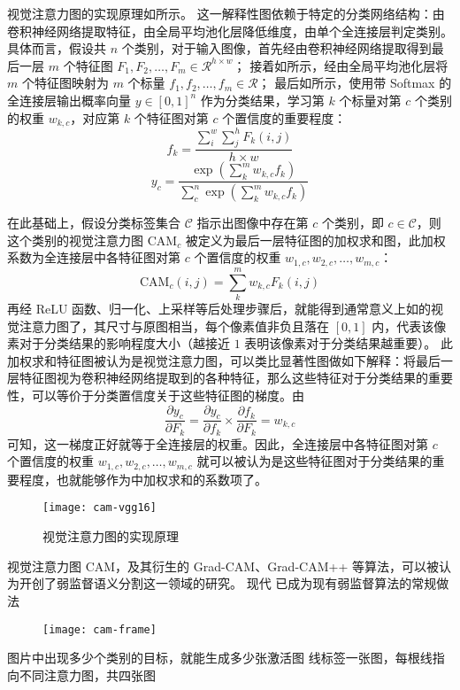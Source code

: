 \par
视觉注意力图的实现原理如所示。
这一解释性图依赖于特定的分类网络结构：由卷积神经网络提取特征，由全局平均池化层\cite{lin2013network}降低维度，由单个全连接层判定类别。
具体而言，假设共 $n$ 个类别，对于输入图像，首先经由卷积神经网络提取得到最后一层 $m$ 个特征图 $F_1, F_2, \dots, F_m \in \mathcal{R}^{h \times w}$；
接着如所示，经由全局平均池化层将 $m$ 个特征图映射为 $m$ 个标量 $f_1, f_2, \dots, f_m \in \mathcal{R}$；
最后如所示，使用带 Softmax 的全连接层输出概率向量 $y \in [0,1]^{n}$ 作为分类结果，学习第 $k$ 个标量对第 $c$ 个类别的权重 $w_{k,c}$，对应第 $k$ 个特征图对第 $c$ 个置信度的重要程度：
\begin{equation}
f_k = \frac{\sum_i^w \sum_j^h F_k(i,j)}{h \times w}
\label{eqn:gap}
\end{equation}
\begin{equation}
y_c = \frac{\exp(\sum_k^m w_{k,c} f_k)}{\sum_c^n \exp(\sum_k^m w_{k,c} f_k)}
\label{eqn:fc}
\end{equation}
\par
在此基础上，假设分类标签集合 $\mathcal{C}$ 指示出图像中存在第 $c$ 个类别，即 $c \in \mathcal{C}$，则这个类别的视觉注意力图 $\text{CAM}_c$ 被定义为最后一层特征图的加权求和图，此加权系数为全连接层中各特征图对第 $c$ 个置信度的权重 $w_{1,c}, w_{2,c}, \dots, w_{m,c}$：
\begin{equation}
\text{CAM}_c(i,j) = \sum_k^m w_{k,c} F_k(i,j)
\label{eqn:cam}
\end{equation}
再经 ReLU 函数、归一化、上采样等后处理步骤后，就能得到通常意义上如的视觉注意力图了，其尺寸与原图相当，每个像素值非负且落在 $[0,1]$ 内，代表该像素对于分类结果的影响程度大小（越接近 $1$ 表明该像素对于分类结果越重要）。
此加权求和特征图被认为是视觉注意力图，可以类比显著性图做如下解释：将最后一层特征图视为卷积神经网络提取到的各种特征，那么这些特征对于分类结果的重要性，可以等价于分类置信度关于这些特征图的梯度。由
\begin{equation}
\frac{\partial{y_c}}{\partial{F_k}} = \frac{\partial{y_c}}{\partial{f_k}} \times \frac{\partial{f_k}}{\partial{F_k}} = w_{k,c}
\end{equation}
可知，这一梯度正好就等于全连接层的权重。因此，全连接层中各特征图对第 $c$ 个置信度的权重 $w_{1,c}, w_{2,c}, \dots, w_{m,c}$ 就可以被认为是这些特征图对于分类结果的重要程度，也就能够作为中加权求和的系数项了。
\par
\begin{figure}[h]
\centering
\texttt{[image: cam-vgg16]}
\caption{视觉注意力图的实现原理}
\label{fig:cam-vgg16}
\end{figure}
\par
视觉注意力图 CAM，及其衍生的 Grad-CAM、Grad-CAM++ 等算法，可以被认为开创了弱监督语义分割这一领域的研究。
现代
已成为现有弱监督算法的常规做法
\par
\begin{figure}[h]
\centering
\texttt{[image: cam-frame]}
\caption{}
\label{fig:cam-frame}
\end{figure}
\par
图片中出现多少个类别的目标，就能生成多少张激活图
线标签一张图，每根线指向不同注意力图，共四张图

